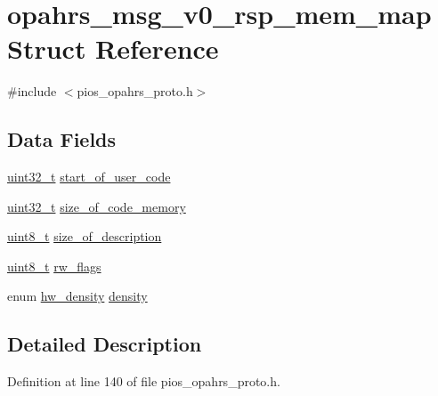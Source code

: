 \hypertarget{structopahrs__msg__v0__rsp__mem__map}{\section{opahrs\-\_\-msg\-\_\-v0\-\_\-rsp\-\_\-mem\-\_\-map Struct Reference}
\label{structopahrs__msg__v0__rsp__mem__map}
}


{\ttfamily \#include $<$pios\-\_\-opahrs\-\_\-proto.\-h$>$}

\subsection*{Data Fields}
\begin{DoxyCompactItemize}
\item 
\hyperlink{stdint_8h_a435d1572bf3f880d55459d9805097f62}{uint32\-\_\-t} \hyperlink{structopahrs__msg__v0__rsp__mem__map_a1936acd8a31ac8b0af3ca8c416e73597}{start\-\_\-of\-\_\-user\-\_\-code}
\item 
\hyperlink{stdint_8h_a435d1572bf3f880d55459d9805097f62}{uint32\-\_\-t} \hyperlink{structopahrs__msg__v0__rsp__mem__map_ad4f10c0d7e3ddaf4e3ae632c86d1a81a}{size\-\_\-of\-\_\-code\-\_\-memory}
\item 
\hyperlink{stdint_8h_aba7bc1797add20fe3efdf37ced1182c5}{uint8\-\_\-t} \hyperlink{structopahrs__msg__v0__rsp__mem__map_a8a93f1c5a5a1f4606152370870fd7e21}{size\-\_\-of\-\_\-description}
\item 
\hyperlink{stdint_8h_aba7bc1797add20fe3efdf37ced1182c5}{uint8\-\_\-t} \hyperlink{structopahrs__msg__v0__rsp__mem__map_af6e70c1a9b8089db3e82b566281f042a}{rw\-\_\-flags}
\item 
enum \hyperlink{group___p_i_o_s___o_p_a_h_r_s_gad994e790427e07b69a993cb12d36059b}{hw\-\_\-density} \hyperlink{structopahrs__msg__v0__rsp__mem__map_a7dcccdb376ffb76d6f8c7f84f147fc0e}{density}
\end{DoxyCompactItemize}


\subsection{Detailed Description}


Definition at line 140 of file pios\-\_\-opahrs\-\_\-proto.\-h.



